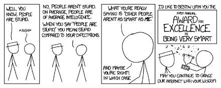 \documentclass[11pt,landscape]{article}
\begin{document}
\begin{figure}[H]
\centering
    \includegraphics[scale=0.5]{./Images/2/people_are_stupidxkcd.png}
\end{figure}
\end{document}
